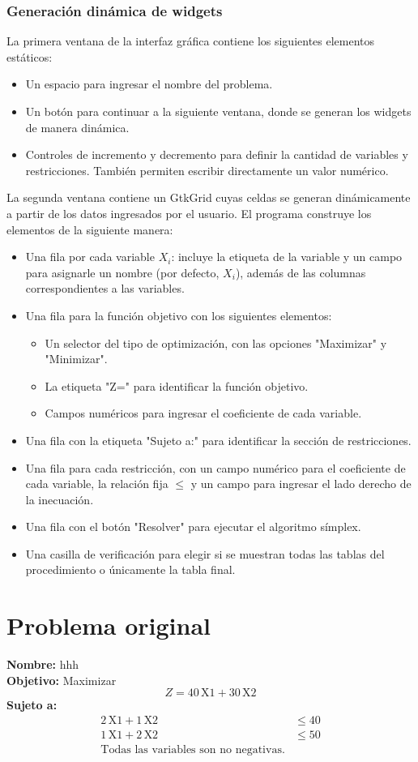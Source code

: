 \documentclass[11pt,oneside]{report}
\begin{document}
\subsection{Generación dinámica de widgets}
La primera ventana de la interfaz gráfica contiene los siguientes elementos estáticos:
\begin{itemize}
\item Un espacio para ingresar el nombre del problema.
\item Un botón para continuar a la siguiente ventana, donde se generan los widgets de manera dinámica.
\item Controles de incremento y decremento para definir la cantidad de variables y restricciones. También permiten escribir directamente un valor numérico.
\end{itemize}
La segunda ventana contiene un GtkGrid cuyas celdas se generan dinámicamente a partir de los datos ingresados por el usuario. El programa construye los elementos de la siguiente manera:
\begin{itemize}
\item Una fila por cada variable $X_i$: incluye la etiqueta de la variable y un campo para asignarle un nombre (por defecto, $X_i$), además de las columnas correspondientes a las variables.
\item Una fila para la función objetivo con los siguientes elementos:
  \begin{itemize}
  \item Un selector del tipo de optimización, con las opciones "Maximizar" y "Minimizar".
  \item La etiqueta "Z=" para identificar la función objetivo.
  \item Campos numéricos para ingresar el coeficiente de cada variable.
  \end{itemize}
\item Una fila con la etiqueta "Sujeto a:" para identificar la sección de restricciones.
\item Una fila para cada restricción, con un campo numérico para el coeficiente de cada variable, la relación fija \(\leq\) y un campo para ingresar el lado derecho de la inecuación.
\item Una fila con el botón "Resolver" para ejecutar el algoritmo símplex.
\item Una casilla de verificación para elegir si se muestran todas las tablas del procedimiento o únicamente la tabla final.
\end{itemize}
\chapter{Problema original}
\textbf{Nombre:} hhh\\
\textbf{Objetivo:} Maximizar\[ Z = 40\,\text{X1} + 30\,\text{X2} \]
\textbf{Sujeto a:}
\begin{align*}
2\,\text{X1} + 1\,\text{X2} &\leq 40 \\
1\,\text{X1} + 2\,\text{X2} &\leq 50 \\
\text{Todas las variables son no negativas.}\end{align*}
\end{document}
